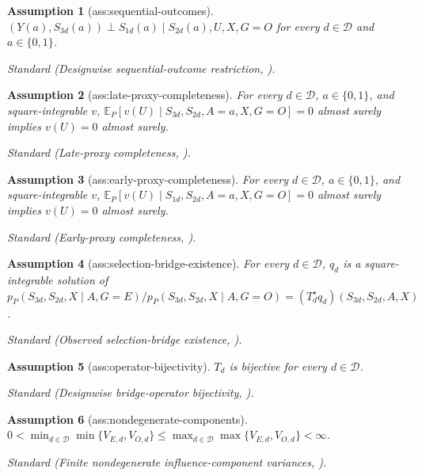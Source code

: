 \documentclass{article}
\newtheorem{assumption}{Assumption}
\begin{document}
\begin{assumption}[ass:sequential-outcomes]\label{ass:sequential-outcomes}
\((Y(a),S_{3d}(a))\perp S_{1d}(a)\mid S_{2d}(a),U,X,G=O\) for every \(d\in\mathcal D\) and \(a\in\{0,1\}\).
\par\smallskip\noindent\emph{Standard} (Designwise sequential-outcome restriction, \cite{ImbensKallusMaoWang2025}).
\end{assumption}

\begin{assumption}[ass:late-proxy-completeness]\label{ass:late-proxy-completeness}
For every \(d\in\mathcal D\), \(a\in\{0,1\}\), and square-integrable \(v\), \(\mathbb E_P[v(U)\mid S_{3d},S_{2d},A=a,X,G=O]=0\) almost surely implies \(v(U)=0\) almost surely.
\par\smallskip\noindent\emph{Standard} (Late-proxy completeness, \cite{ImbensKallusMaoWang2025}).
\end{assumption}

\begin{assumption}[ass:early-proxy-completeness]\label{ass:early-proxy-completeness}
For every \(d\in\mathcal D\), \(a\in\{0,1\}\), and square-integrable \(v\), \(\mathbb E_P[v(U)\mid S_{1d},S_{2d},A=a,X,G=O]=0\) almost surely implies \(v(U)=0\) almost surely.
\par\smallskip\noindent\emph{Standard} (Early-proxy completeness, \cite{ImbensKallusMaoWang2025}).
\end{assumption}

\begin{assumption}[ass:selection-bridge-existence]\label{ass:selection-bridge-existence}
For every \(d\in\mathcal D\), \(q_d\) is a square-integrable solution of \(p_P(S_{3d},S_{2d},X\mid A,G=E)/p_P(S_{3d},S_{2d},X\mid A,G=O)=(T_d^\star q_d)(S_{3d},S_{2d},A,X)\).
\par\smallskip\noindent\emph{Standard} (Observed selection-bridge existence, \cite{ImbensKallusMaoWang2025}).
\end{assumption}

\begin{assumption}[ass:operator-bijectivity]\label{ass:operator-bijectivity}
\(T_d\) is bijective for every \(d\in\mathcal D\).
\par\smallskip\noindent\emph{Standard} (Designwise bridge-operator bijectivity, \cite{ImbensKallusMaoWang2025}).
\end{assumption}

\begin{assumption}[ass:nondegenerate-components]\label{ass:nondegenerate-components}
\(0<\min_{d\in\mathcal D}\min\{V_{E,d},V_{O,d}\}\le\max_{d\in\mathcal D}\max\{V_{E,d},V_{O,d}\}<\infty\).
\par\smallskip\noindent\emph{Standard} (Finite nondegenerate influence-component variances, \cite{ImbensKallusMaoWang2025}).
\end{assumption}
\end{document}
